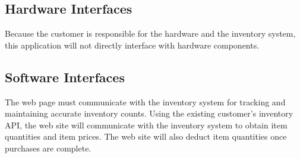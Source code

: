 \documentclass{scrreprt}
\theoremstyle{funreq}
\begin{document}
\subsection{Hardware Interfaces}
Because the customer is responsible for the hardware and the inventory system, this application will not directly interface with hardware components. 

\subsection{Software Interfaces}
The web page must communicate with the inventory system for tracking and maintaining accurate inventory counts.  Using the existing customer's inventory API, the web site will communicate with the inventory system to obtain item quantities and item prices.  The web site will also deduct item quantities once purchases are complete.


\end{document}
